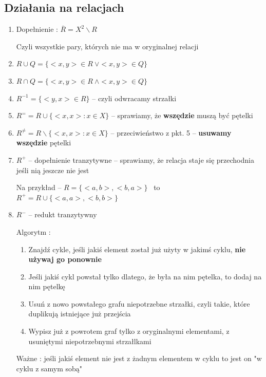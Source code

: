 \subsection{Działania na relacjach}

\begin{enumerate}
    \item Dopełnienie : $ \overline{R} = X^2 \backslash R $
    
    Czyli wszystkie pary, których nie ma w oryginalnej relacji

    \item $ R \cup Q = \{ <x,y> \in R \ \lor <x,y> \in Q \} $
    \item $ R \cap Q = \{ <x,y> \in R \ \land <x,y> \in Q \} $
    \item $ R^{-1} = \{<y,x> \in R\} $ -- czyli odwracamy strzałki
    \item $ R^{=} = R \cup \{<x,x> : x \in X\} $ -- sprawiamy, że \textbf{wszędzie} muszą być pętelki
    \item $ R^{\neq} = R \backslash \{ <x,x> : x \in X \} $ -- przeciwieństwo z pkt. 5 -- \textbf{usuwamy wszędzie} pętelki
    \item $ R^+ $ -- dopełnienie tranzytywne -- sprawiamy, że relacja staje się przechodnia jeśli nią jeszcze nie jest
    
    Na przykład -- $ R = \{ <a,b>, <b,a> \} $ \ to \ $ R^+ = R \cup \{ <a,a>, <b,b> \} $ 

    \item $ R^- $ -- redukt tranzytywny
    
    Algorytm :
    \begin{enumerate}
        \item Znajdź cykle, jeśli jakiś element został już użyty w jakimś cyklu, \textbf{nie używaj go ponownie}
        \item Jeśli jakiś cykl powstał tylko dlatego, że była na nim pętelka, to dodaj na nim pętelkę
        \item Usuń z nowo powstałego grafu niepotrzebne strzałki, czyli takie, które duplikują istniejące już przejścia
        \item Wypisz już z powrotem graf tylko z oryginalnymi elementami, z usuniętymi niepotrzebnymi strzałlkami
    \end{enumerate}

    Ważne : jeśli jakiś element nie jest z żadnym elementem w cyklu to jest on "w cyklu z samym sobą"
    

\end{enumerate}
